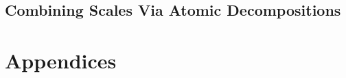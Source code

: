\documentclass[12pt]{report}
\theoremstyle{plain}
\theoremstyle{remark}
\numberwithin{equation}{section}
\begin{document}
\chapter{Combining Scales Via Atomic Decompositions} \label{chap:spectralatomicdchapter}


\part{Appendices}


%

%

\singlespacing
\printbibliography
\end{document}
